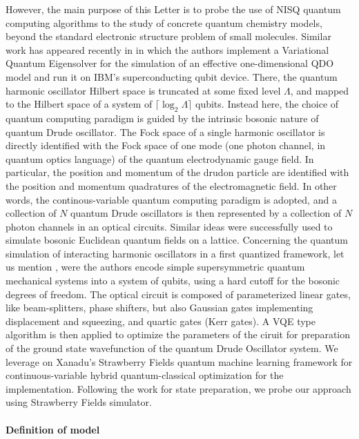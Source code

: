 \documentclass[reprint, amsmath, amssymb, aps, pra]{revtex4-2}
\begin{document}
    However, the main purpose of this Letter is to probe the use of NISQ quantum computing algorithms to the study of concrete quantum chemistry models, beyond the standard electronic structure problem of small molecules. Similar work has appeared recently in \cite{anderson2022coarse} in which the authors implement a Variational Quantum Eigensolver for the simulation of an effective one-dimensional QDO model and run it on IBM's superconducting qubit device. There, the quantum harmonic oscillator Hilbert space is truncated at some fixed level $\Lambda$, and mapped to the Hilbert space of a system of $\lceil\log_2\Lambda\rceil$ qubits. Instead here, the choice of quantum computing paradigm is guided by the intrinsic bosonic nature of quantum Drude oscillator. The Fock space of a single harmonic oscillator is directly identified with the Fock space of one mode (one photon channel, in quantum optics language) of the quantum electrodynamic gauge field. In particular, the position and momentum of the drudon particle are identified with the position and momentum quadratures of the electromagnetic field. In other words, the continous-variable quantum computing paradigm is adopted, and a collection of $N$ quantum Drude oscillators is then represented by a collection of $N$ photon channels in an optical circuits. Similar ideas were successfully used to simulate bosonic Euclidean quantum fields \cite{marshall2015quantum, yeter2022quantum} on a lattice. Concerning the quantum simulation of interacting harmonic oscillators in a first quantized framework, let us mention \cite{Culver:2021rxo}, were the authors encode simple supersymmetric quantum mechanical systems into a system of qubits, using a hard cutoff for the bosonic degrees of freedom. The optical circuit is composed of parameterized linear gates, like beam-splitters, phase shifters, but also Gaussian gates implementing displacement and squeezing, and quartic gates (Kerr gates). A VQE type algorithm is then applied to optimize the parameters of the ciruit for preparation of the ground state wavefunction of the quantum Drude Oscillator system. We leverage on Xanadu's Strawberry Fields quantum machine learning framework for continuous-variable hybrid quantum-classical optimization \cite{schuld2021machine, killoran2019continuous, arrazola2019machine} for the implementation. Following the work \cite{arrazola2019machine} for state preparation, we probe our approach using Strawberry Fields simulator.
    \newline
\paragraph*{Definition of model}
\end{document}
